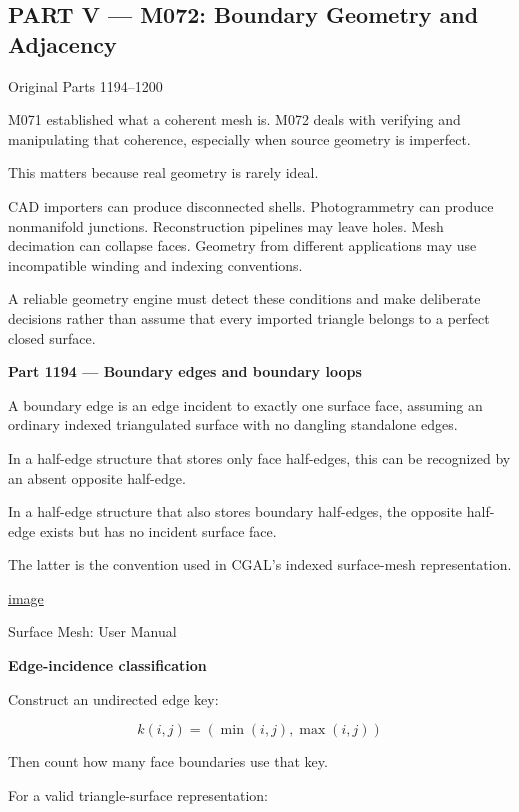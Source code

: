 \subsection{PART V --- M072: Boundary Geometry and Adjacency}\label{04-visual-computing-ii-ch023-part-v-m072-boundary-geometry-and-adjacency}

\hypertarget{04-visual-computing-ii-ch023-part-v-m072-boundary-geometry-and-adjacency}{}

Original Parts 1194--1200

M071 established what a coherent mesh is. M072 deals with verifying and manipulating that coherence, especially when source geometry is imperfect.

This matters because real geometry is rarely ideal.

CAD importers can produce disconnected shells. Photogrammetry can produce nonmanifold junctions. Reconstruction pipelines may leave holes. Mesh decimation can collapse faces. Geometry from different applications may use incompatible winding and indexing conventions.

A reliable geometry engine must detect these conditions and make deliberate decisions rather than assume that every imported triangle belongs to a perfect closed surface.

\textbf{Part 1194 --- Boundary edges and boundary loops}

A boundary edge is an edge incident to exactly one surface face, assuming an ordinary indexed triangulated surface with no dangling standalone edges.

In a half-edge structure that stores only face half-edges, this can be recognized by an absent opposite half-edge.

In a half-edge structure that also stores boundary half-edges, the opposite half-edge exists but has no incident surface face.

The latter is the convention used in CGAL's indexed surface-mesh representation. 

\href{https://www.google.com/s2/favicons?domain=https://doc.cgal.org&sz=32}{image}

Surface Mesh: User Manual

\textbf{Edge-incidence classification}

Construct an undirected edge key:

\[
k(i,j)=(\min(i,j),\max(i,j))
\]

Then count how many face boundaries use that key.

For a valid triangle-surface representation:

